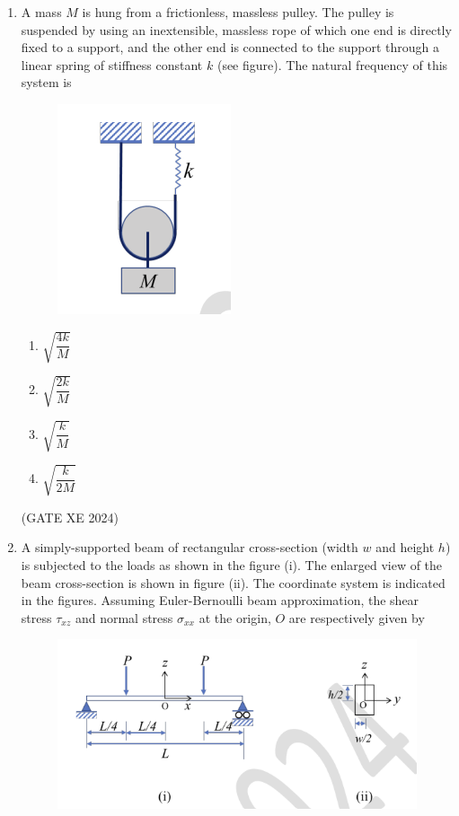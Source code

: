 \documentclass[12pt]{article}
\begin{document}
\begin{enumerate}
(GATE XE 2024)

\item A mass $M$ is hung from a frictionless, massless pulley. The pulley is suspended by using an inextensible, massless rope of which one end is directly fixed to a support, and the other end is connected to the support through a linear spring of stiffness constant $k$ (see figure). The natural frequency of this system is

\begin{figure}[H]
    \centering
    \includegraphics[width=0.5\columnwidth]{figs/ass5_d_q69.png}
    \caption{}
    \label{fig:placeholder}
\end{figure}

\begin{enumerate}
\item $\sqrt{\dfrac{4k}{M}}$
\item $\sqrt{\dfrac{2k}{M}}$
\item $\sqrt{\dfrac{k}{M}}$
\item $\sqrt{\dfrac{k}{2M}}$
\end{enumerate}

(GATE XE 2024)

\item A simply-supported beam of rectangular cross-section (width $w$ and height $h$) is subjected to the loads as shown in the figure (i). The enlarged view of the beam cross-section is shown in figure (ii). The coordinate system is indicated in the figures. Assuming Euler-Bernoulli beam approximation, the shear stress $\tau_{xz}$ and normal stress $\sigma_{xx}$ at the origin, $O$ are respectively given by

\begin{figure}[H]
    \centering
    \includegraphics[width=0.5\columnwidth]{figs/ass5_d_q70.png}
    \caption{}
    \label{fig:placeholder}
\end{figure}


\end{enumerate}
\end{document}
